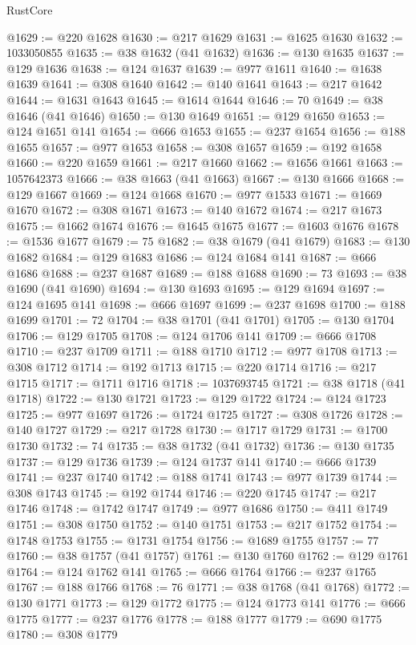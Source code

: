 \begin{lexlean}{RustCore}
\begin{coremodule}
@1629 := @220 @1628
@1630 := @217 @1629
@1631 := @1625 @1630
@1632 := 1033050855
@1635 := @38 @1632 (@41 @1632)
@1636 := @130 @1635
@1637 := @129 @1636
@1638 := @124 @1637
@1639 := @977 @1611
@1640 := @1638 @1639
@1641 := @308 @1640
@1642 := @140 @1641
@1643 := @217 @1642
@1644 := @1631 @1643
@1645 := @1614 @1644
@1646 := 70
@1649 := @38 @1646 (@41 @1646)
@1650 := @130 @1649
@1651 := @129 @1650
@1653 := @124 @1651 @141
@1654 := @666 @1653
@1655 := @237 @1654
@1656 := @188 @1655
@1657 := @977 @1653
@1658 := @308 @1657
@1659 := @192 @1658
@1660 := @220 @1659
@1661 := @217 @1660
@1662 := @1656 @1661
@1663 := 1057642373
@1666 := @38 @1663 (@41 @1663)
@1667 := @130 @1666
@1668 := @129 @1667
@1669 := @124 @1668
@1670 := @977 @1533
@1671 := @1669 @1670
@1672 := @308 @1671
@1673 := @140 @1672
@1674 := @217 @1673
@1675 := @1662 @1674
@1676 := @1645 @1675
@1677 := @1603 @1676
@1678 := @1536 @1677
@1679 := 75
@1682 := @38 @1679 (@41 @1679)
@1683 := @130 @1682
@1684 := @129 @1683
@1686 := @124 @1684 @141
@1687 := @666 @1686
@1688 := @237 @1687
@1689 := @188 @1688
@1690 := 73
@1693 := @38 @1690 (@41 @1690)
@1694 := @130 @1693
@1695 := @129 @1694
@1697 := @124 @1695 @141
@1698 := @666 @1697
@1699 := @237 @1698
@1700 := @188 @1699
@1701 := 72
@1704 := @38 @1701 (@41 @1701)
@1705 := @130 @1704
@1706 := @129 @1705
@1708 := @124 @1706 @141
@1709 := @666 @1708
@1710 := @237 @1709
@1711 := @188 @1710
@1712 := @977 @1708
@1713 := @308 @1712
@1714 := @192 @1713
@1715 := @220 @1714
@1716 := @217 @1715
@1717 := @1711 @1716
@1718 := 1037693745
@1721 := @38 @1718 (@41 @1718)
@1722 := @130 @1721
@1723 := @129 @1722
@1724 := @124 @1723
@1725 := @977 @1697
@1726 := @1724 @1725
@1727 := @308 @1726
@1728 := @140 @1727
@1729 := @217 @1728
@1730 := @1717 @1729
@1731 := @1700 @1730
@1732 := 74
@1735 := @38 @1732 (@41 @1732)
@1736 := @130 @1735
@1737 := @129 @1736
@1739 := @124 @1737 @141
@1740 := @666 @1739
@1741 := @237 @1740
@1742 := @188 @1741
@1743 := @977 @1739
@1744 := @308 @1743
@1745 := @192 @1744
@1746 := @220 @1745
@1747 := @217 @1746
@1748 := @1742 @1747
@1749 := @977 @1686
@1750 := @411 @1749
@1751 := @308 @1750
@1752 := @140 @1751
@1753 := @217 @1752
@1754 := @1748 @1753
@1755 := @1731 @1754
@1756 := @1689 @1755
@1757 := 77
@1760 := @38 @1757 (@41 @1757)
@1761 := @130 @1760
@1762 := @129 @1761
@1764 := @124 @1762 @141
@1765 := @666 @1764
@1766 := @237 @1765
@1767 := @188 @1766
@1768 := 76
@1771 := @38 @1768 (@41 @1768)
@1772 := @130 @1771
@1773 := @129 @1772
@1775 := @124 @1773 @141
@1776 := @666 @1775
@1777 := @237 @1776
@1778 := @188 @1777
@1779 := @690 @1775
@1780 := @308 @1779

\end{coremodule}
\end{lexlean}
